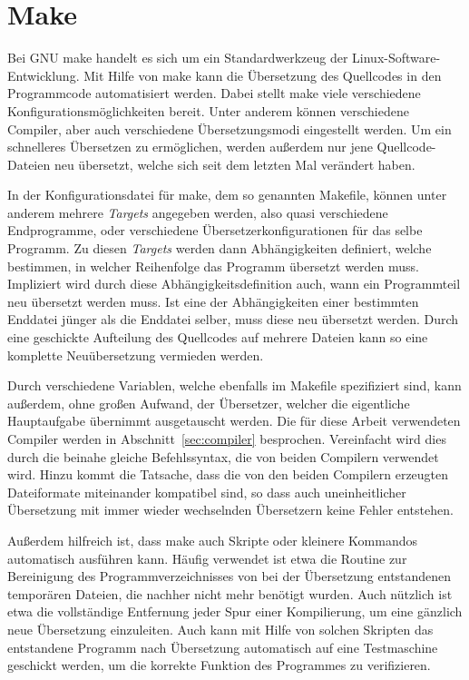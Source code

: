 \section{Make}
\label{sec:make}
Bei GNU make handelt es sich um ein Standardwerkzeug der Linux-Software-Entwicklung. Mit Hilfe von make kann die Übersetzung des Quellcodes in den Programmcode automatisiert werden. 
Dabei stellt make viele verschiedene Konfigurationsmöglichkeiten bereit. Unter anderem können verschiedene Compiler, aber auch verschiedene Übersetzungsmodi eingestellt werden.
Um ein schnelleres Übersetzen zu ermöglichen, werden außerdem nur jene Quellcode-Dateien neu übersetzt, welche sich seit dem letzten Mal verändert haben. 

In der Konfigurationsdatei für make, dem so genannten Makefile, können unter anderem mehrere \textit{Targets} angegeben werden, also quasi verschiedene Endprogramme, oder verschiedene
Übersetzerkonfigurationen für das selbe Programm. Zu diesen \textit{Targets} werden dann Ab\-hängig\-keiten definiert, welche bestimmen, in welcher Reihenfolge das Programm übersetzt werden 
muss. Impliziert wird durch diese Abhängigkeitsdefinition auch, wann ein Programmteil neu übersetzt werden muss. Ist eine der Abhängigkeiten einer bestimmten Enddatei jünger als die 
Enddatei selber, muss diese neu übersetzt werden. Durch eine geschickte Aufteilung des Quellcodes auf mehrere Dateien kann so eine komplette Neuübersetzung vermieden werden. 

Durch verschiedene Variablen, welche ebenfalls im Makefile spezifiziert sind, kann außerdem, ohne großen Aufwand, der Übersetzer, welcher die eigentliche Hauptaufgabe übernimmt ausgetauscht werden.
Die für diese Arbeit verwendeten Compiler werden in Abschnitt~\ref{sec:compiler} besprochen. Vereinfacht wird dies durch die beinahe gleiche Befehlssyntax, die von beiden Compilern verwendet wird.
Hinzu kommt die Tatsache, dass die von den beiden Compilern erzeugten Dateiformate miteinander kompatibel sind, so dass auch uneinheitlicher Übersetzung mit immer wieder wechselnden Übersetzern
keine Fehler entstehen.

Außerdem hilfreich ist, dass make auch Skripte oder kleinere Kommandos automatisch aus\-füh\-ren kann. Häufig verwendet ist etwa die Routine zur Bereinigung des Programmverzeichnisses von bei der
Übersetzung entstandenen temporären Dateien, die nachher nicht mehr benötigt wurden. Auch nützlich ist etwa die vollständige Entfernung jeder Spur einer Kompilierung, um eine gänzlich neue
Übersetzung einzuleiten. Auch kann mit Hilfe von solchen Skripten das entstandene Programm nach Übersetzung automatisch auf eine Testmaschine geschickt werden, um die korrekte Funktion
des Programmes zu verifizieren.

